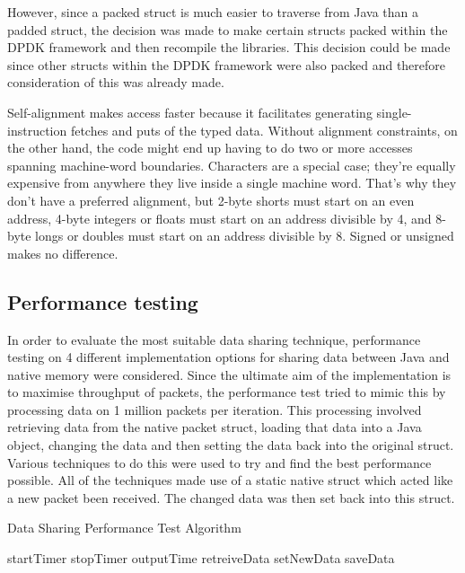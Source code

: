 \documentclass[final_report.tex]{subfiles}
\begin{document}
However, since a packed struct is much easier to traverse from Java than a padded struct, the decision was made to make certain structs packed within the DPDK framework and then recompile the libraries. This decision could be made since other structs within the DPDK framework were also packed and therefore consideration of this was already made.

Self-alignment \cite{bytealign} makes access faster because it facilitates generating single-instruction fetches and puts of the typed data. Without alignment constraints, on the other hand, the code might end up having to do two or more accesses spanning machine-word boundaries. Characters are a special case; they're equally expensive from anywhere they live inside a single machine word. That's why they don't have a preferred alignment, but 2-byte shorts must start on an even address, 4-byte integers or floats must start on an address divisible by 4, and 8-byte longs or doubles must start on an address divisible by 8. Signed or unsigned makes no difference.

\subsection{Performance testing}
\label{sec:perfTest}
In order to evaluate the most suitable data sharing technique, performance testing on 4 different implementation options for sharing data between Java and native memory were considered. Since the ultimate aim of the implementation is to maximise throughput of packets, the performance test tried to mimic this by processing data on 1 million packets per iteration. This processing involved retrieving data from the native packet struct, loading that data into a Java object, changing the data and then setting the data back into the original struct. Various techniques to do this were used to try and find the best performance possible. All of the techniques made use of a static native struct which acted like a new packet been received. The changed data was then set back into this struct.

\begin{algorithm}[H]
	\caption{Data Sharing Performance Test Algorithm}
	\label{alg:data}
	\begin{algorithmic}[1]
				\State startTimer
				\State {}
				\State stopTimer
				\State outputTime				
			\EndFor
		\EndFunction
		\newline
				\State retreiveData
				\State setNewData
				\State saveData
			\EndFor
		\EndFunction
	\end{algorithmic}
\end{algorithm}
\end{document}
